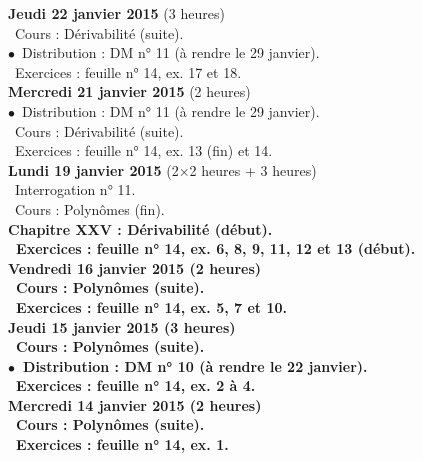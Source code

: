\documentclass[12pt,a4paper]{article}
\begin{document}
\noindent\textbf{ \bf Jeudi 22 janvier 2015 \rm}(3 heures)\\
\bu\ Cours : Dérivabilité (suite).\\
$\bullet$\ Distribution : DM n° 11 (à rendre le 29 janvier).\\
\bu\ Exercices : feuille n° 14, ex. 17 et 18.\vspace{.4cm}\\

\noindent\textbf{ Mercredi 21 janvier 2015 \rm} (2 heures)\\
$\bullet$\ Distribution : DM n° 11 (à rendre le 29 janvier).\\
\bu\ Cours : Dérivabilité (suite).\\
\bu\ Exercices : feuille n° 14, ex. 13 (fin) et 14.\vspace{.4cm}\\

\noindent\textbf{ Lundi 19 janvier 2015 \rm} (2$\times$2 heures + 3 heures)\\
\bu\ Interrogation n° 11.\\
\bu\ Cours : Polynômes (fin).\\
\bf Chapitre XXV \rm : Dérivabilité (début).\\
\bu\ Exercices : feuille n° 14, ex. 6, 8, 9, 11, 12 et 13 (début).\vspace{.4cm}\\

\noindent\textbf{ \bf Vendredi 16 janvier 2015 \rm}(2 heures)\\
\bu\ Cours : Polynômes (suite).\\
\bu\ Exercices : feuille n° 14, ex. 5, 7 et 10.\vspace{.4cm}\\

\noindent\textbf{ \bf Jeudi 15 janvier 2015 \rm}(3 heures)\\
\bu\ Cours : Polynômes (suite).\\
$\bullet$\ Distribution : DM n° 10 (à rendre le 22 janvier).\\
\bu\ Exercices : feuille n° 14, ex. 2 à 4.\vspace{.4cm}\\

\noindent\textbf{ Mercredi 14 janvier 2015 \rm} (2 heures)\\
\bu\ Cours : Polynômes (suite).\\
\bu\ Exercices : feuille n° 14, ex. 1.\vspace{.4cm}\\
\end{document}
